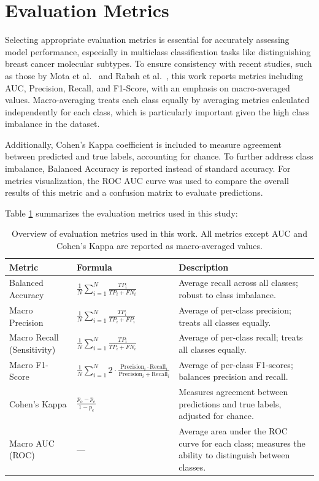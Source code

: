 \documentclass[a4paper,10pt]{book}
\begin{document}
\section{Evaluation Metrics}

Selecting appropriate evaluation metrics is essential for accurately assessing model performance, especially in multiclass classification tasks like distinguishing breast cancer molecular subtypes. To ensure consistency with recent studies, such as those by Mota et al.\ \cite{mota_breast_2024} and Rabah et al.\ \cite{ben_rabah_multimodal_2025}, this work reports metrics including AUC, Precision, Recall, and F1-Score, with an emphasis on macro-averaged values. Macro-averaging treats each class equally by averaging metrics calculated independently for each class, which is particularly important given the high class imbalance in the dataset. 

Additionally, Cohen’s Kappa coefficient is included to measure agreement between predicted and true labels, accounting for chance. To further address class imbalance, Balanced Accuracy is reported instead of standard accuracy. For metrics visualization, the ROC AUC curve was used to compare the overall results of this metric and a confusion matrix \cite{noauthor_que_nodate} to evaluate predictions.

Table \ref{tab:metrics_overview} summarizes the evaluation metrics used in this study:

\begin{table}[h!]
\centering
\caption[Metrics Overview]{Overview of evaluation metrics used in this work. All metrics except AUC and Cohen's Kappa are reported as macro-averaged values.}
\begin{tabularx}{\textwidth}{l X X}
\toprule
\textbf{Metric} & \textbf{Formula} & \textbf{Description} \\
\midrule
    Balanced Accuracy &
    $\frac{1}{N}\sum_{i=1}^N \frac{TP_i}{TP_i + FN_i}$ &
    Average recall across all classes; robust to class imbalance.  \\
    Macro Precision &
    $\frac{1}{N}\sum_{i=1}^N \frac{TP_i}{TP_i + FP_i}$ &
    Average of per-class precision; treats all classes equally.  \\
    Macro Recall (Sensitivity) &
    $\frac{1}{N}\sum_{i=1}^N \frac{TP_i}{TP_i + FN_i}$ &
    Average of per-class recall; treats all classes equally.  \\
    Macro F1-Score &
    $\frac{1}{N}\sum_{i=1}^N 2 \cdot \frac{\text{Precision}_i \cdot \text{Recall}_i}{\text{Precision}_i + \text{Recall}_i}$ &
    Average of per-class F1-scores; balances precision and recall.  \\
    Cohen's Kappa &
    $\frac{p_o - p_e}{1 - p_e}$ &
    Measures agreement between predictions and true labels, adjusted for chance.  \\
    Macro AUC (ROC) &
    --- &
    Average area under the ROC curve for each class; measures the ability to distinguish between classes.  \\
\bottomrule
\end{tabularx}
\label{tab:metrics_overview}
\end{table}
\end{document}
